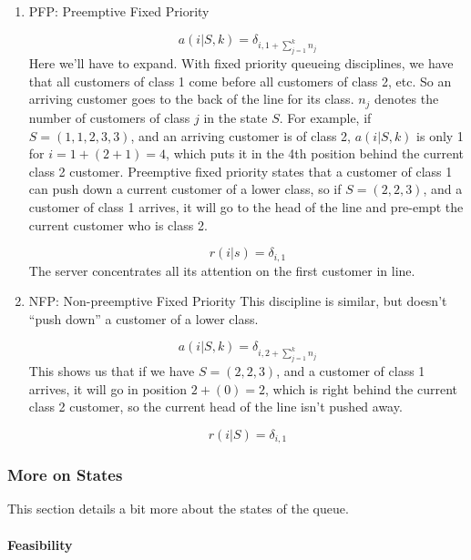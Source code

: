 \documentclass[12pt,titlepage]{article}
\theoremstyle{plain}
\theoremstyle{definition}
\theoremstyle{remark}
\begin{document}
\begin{enumerate}
\item PFP: Preemptive Fixed Priority

\begin{displaymath}
a(i|S,k) = \delta_{i,1+\sum_{j=1}^{k}n_{j}}
\end{displaymath}
Here we'll have to expand. With fixed priority queueing disciplines, we have that all customers of class 1 come before all customers of class 2, etc. So an arriving customer goes to the back of the line for its class. $n_{j}$ denotes the number of customers of class $j$ in the state $S$. For example, if $S = (1,1,2,3,3)$, and an arriving customer is of class 2, $a(i|S,k)$ is only 1 for $i = 1+(2+1) = 4$, which puts it in the 4th position behind the current class 2 customer. Preemptive fixed priority states that a customer of class 1 can push down a current customer of a lower class, so if $S = (2,2,3)$, and a customer of class 1 arrives, it will go to the head of the line and pre-empt the current customer who is class 2.

\begin{displaymath}
r(i|s) = \delta_{i,1}
\end{displaymath}
The server concentrates all its attention on the first customer in line.


\item NFP: Non-preemptive Fixed Priority This discipline is similar, but doesn't ``push down'' a customer of a lower class.

\begin{displaymath}
a(i|S,k) = \delta_{i, 2+\sum_{j=1}^{k}n_{j}}
\end{displaymath}
This shows us that if we have $S = (2,2,3)$, and a customer of class 1 arrives, it will go in position $2 + (0) = 2$, which is right behind the current class 2 customer, so the current head of the line isn't pushed away.

\begin{displaymath}
r(i|S) = \delta_{i,1}
\end{displaymath}


\end{enumerate}
\hypertarget{more_on_states}{}\subsubsection*{{More on States}}\label{more_on_states}

This section details a bit more about the states of the queue.

\hypertarget{feasibility}{}\paragraph*{{Feasibility}}\label{feasibility}
\end{document}
